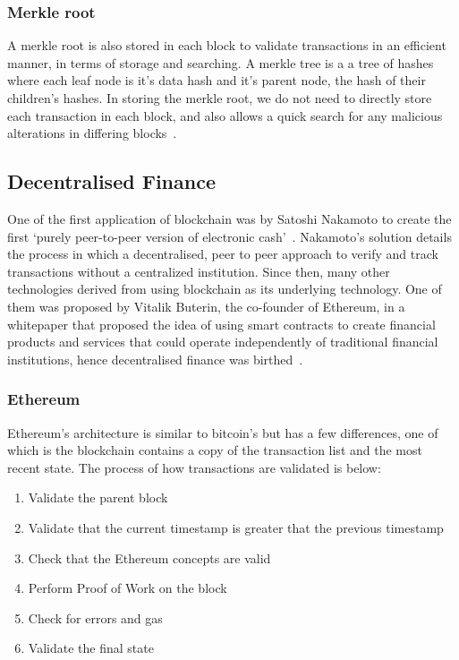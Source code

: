 \subsubsection{Merkle root}
A merkle root is also stored in each block to validate transactions in an efficient manner, in terms of storage and searching. A merkle tree is a a tree of hashes where each leaf node is it's data hash and it's parent node, the hash of their children's hashes. In storing the merkle root, we do not need to directly store each transaction in each block, and also allows a quick search for any malicious alterations in differing blocks~\cite{noauthor_merkle_nodate}.

\subsection{Decentralised Finance}
One of the first application of blockchain was by Satoshi Nakamoto to create the first `purely peer-to-peer version of electronic cash'~\cite{nakamoto2009bitcoin}. Nakamoto's solution details the process in which a decentralised, peer to peer approach to verify and track transactions without a centralized institution. Since then, many other technologies derived from using blockchain as its underlying technology. One of them was proposed by Vitalik Buterin, the co-founder of Ethereum, in a whitepaper that proposed the idea of using smart contracts to create financial products and services that could operate independently of traditional financial institutions, hence decentralised finance was birthed~\cite{buterin2014next}.

\subsubsection{Ethereum}
Ethereum's architecture is similar to bitcoin's but has a few differences, one of which is the blockchain contains a copy of the transaction list and the most recent state. The process of how transactions are validated is below:
\begin{enumerate}
    \itemsep0em
    \item Validate the parent block
    \item Validate that the current timestamp is greater that the previous timestamp
    \item Check that the Ethereum concepts are valid
    \item Perform Proof of Work on the block
    \item Check for errors and gas
    \item Validate the final state
\end{enumerate}


